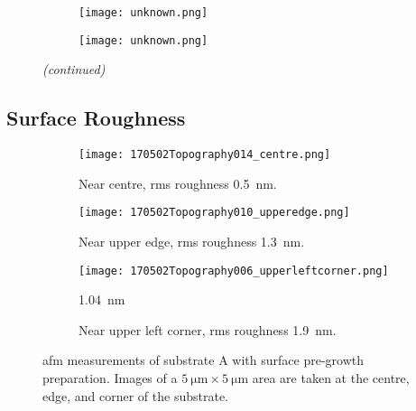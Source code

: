 \begin{figure}[htbp]
\ContinuedFloat
    \centering
    \begin{subfigure}[t]{\textwidth}
          \begin{minipage}[t]{0.49\linewidth}
            \centering
            \texttt{[image: unknown.png]}
          \end{minipage}
          \hspace{0.02\linewidth}
          \begin{minipage}[t]{0.49\linewidth}
            \centering
            \texttt{[image: unknown.png]}
          \end{minipage}
        \caption{}\label{fig:add_label}
    \end{subfigure}
    \captionsetup{list=no}
    \caption{\emph{(continued)}}
\end{figure}


\subsection{Surface Roughness}

\begin{figure}[htbp]
    \centering
    \begin{subfigure}[t]{\linewidth}
        \centering
        \texttt{[image: 170502Topography014\_centre.png]}
        \caption{Near centre, \ac{rms} roughness \SI{0.5}{\nano\metre}.} %
    \end{subfigure}%
    \par\bigskip
    \begin{subfigure}[t]{\linewidth}
        \centering
        \texttt{[image: 170502Topography010\_upperedge.png]}
        \caption{Near upper edge, \ac{rms} roughness \SI{1.3}{\nano\metre}.} %
    \end{subfigure}%
    \par\bigskip
    \begin{subfigure}[t]{\linewidth}
        \centering
        \texttt{[image: 170502Topography006\_upperleftcorner.png]}
        \caption{Near upper left corner, \ac{rms} roughness \SI{1.9}{\nano\metre}.}\SI{1,04}{\nano\metre}
    \end{subfigure}%
    \caption[\Ac{afm} of substrate A with surface pre-growth preparation.]{\Acf{afm} measurements of substrate A with surface pre-growth preparation. Images of a $\SI{5}{\micro\metre}\times\SI{5}{\micro\metre}$ area are taken at the centre, edge, and corner of the substrate.}\label{fig:afm_subAb}
\end{figure} %

